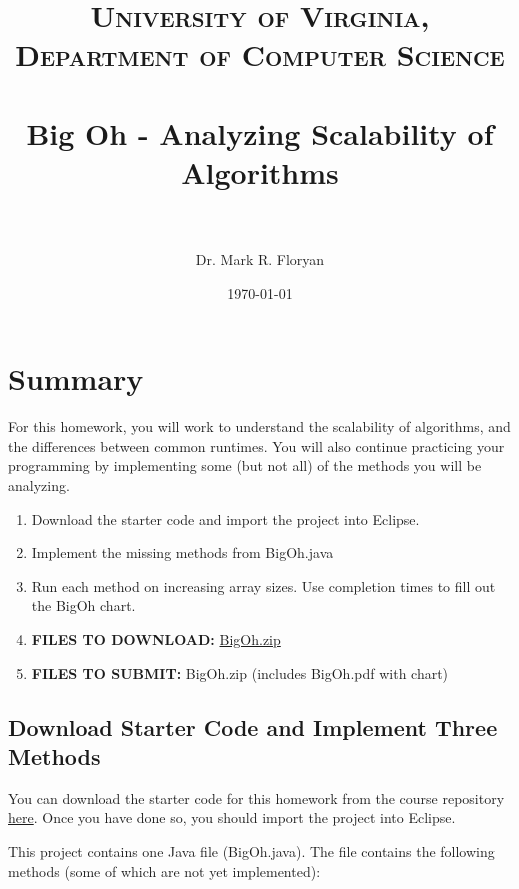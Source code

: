 \documentclass[paper=a4, fontsize=11pt, parskip=full]{scrartcl} %
\title{
\normalfont \normalsize
\textsc{University of Virginia, Department of Computer Science} \\ [25pt] %
\horrule{0.5pt} \\[0.4cm] %
\huge Big Oh - Analyzing Scalability of Algorithms \\ %
\horrule{2pt} \\[0.5cm] %
}
\author{Dr. Mark R. Floryan} %
\date{\normalsize\today} %
\numberwithin{equation}{section} %
\numberwithin{figure}{section} %
\numberwithin{table}{section} %
\begin{document}
\maketitle %


\section{Summary}

For this homework, you will work to understand the scalability of algorithms, and the differences between common runtimes. You will also continue practicing your programming by implementing some (but not all) of the methods you will be analyzing.

\begin{enumerate}
	\item Download the starter code and import the project into Eclipse.
	\item Implement the missing methods from BigOh.java
	\item Run each method on increasing array sizes. Use completion times to fill out the BigOh chart.
	\item \textbf{FILES TO DOWNLOAD:} \href{https://markfloryan.github.io/dsa1/homeworks/BigOh/code/BigOh.zip}{BigOh.zip}
	\item \textbf{FILES TO SUBMIT:} BigOh.zip (includes BigOh.pdf with chart)
\end{enumerate}


\subsection{Download Starter Code and Implement Three Methods}

You can download the starter code for this homework from the course repository \href{https://markfloryan.github.io/dsa1/homeworks/BigOh/code/BigOh.zip}{here}. Once you have done so, you should import the project into Eclipse.

This project contains one Java file (BigOh.java). The file contains the following methods (some of which are not yet implemented):
\end{document}
